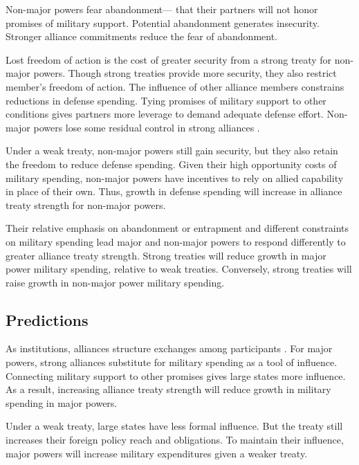 \documentclass[12pt]{article}
\begin{document}
Non-major powers fear abandonment--- that their partners will not honor promises of military support.
Potential abandonment generates insecurity. 
Stronger alliance commitments reduce the fear of abandonment. 


Lost freedom of action is the cost of greater security from a strong treaty for non-major powers.
Though strong treaties provide more security, they also restrict member's freedom of action. 
The influence of other alliance members constrains reductions in defense spending.
Tying promises of military support to other conditions gives partners more leverage to demand adequate defense effort. 
Non-major powers lose some residual control in strong alliances \citep{Lake1996}. 


Under a weak treaty, non-major powers still gain security, but they also retain the freedom to reduce defense spending.    
Given their high opportunity costs of military spending, non-major powers have incentives to rely on allied capability in place of their own. 
Thus, growth in defense spending will increase in alliance treaty strength for non-major powers. 


Their relative emphasis on abandonment or entrapment and different constraints on military spending lead major and non-major powers to respond differently to greater alliance treaty strength. 
Strong treaties will reduce growth in major power military spending, relative to weak treaties. 
Conversely, strong treaties will raise growth in non-major power military spending. 

 


\subsection{Predictions} 

 
As institutions, alliances structure exchanges among participants \citep{Williamson1985, North1990, DiermeierKrehbiel2003}.
For major powers, strong alliances substitute for military spending as a tool of influence. 
Connecting military support to other promises gives large states more influence.
As a result, increasing alliance treaty strength will reduce growth in military spending in major powers. 


Under a weak treaty, large states have less formal influence. 
But the treaty still increases their foreign policy reach and obligations. 
To maintain their influence, major powers will increase military expenditures given a weaker treaty. 
\end{document}
